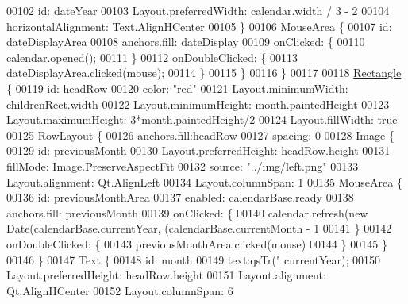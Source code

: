 \begin{DoxyCode}
{{00102                 \textcolor{keywordtype}{id}: dateYear
00103                 Layout.preferredWidth: calendar.width / 3 - 2
00104                 horizontalAlignment: Text.AlignHCenter
00105             \}
00106             MouseArea \{
00107                 \textcolor{keywordtype}{id}: dateDisplayArea
00108                 anchors.fill: dateDisplay
00109                 onClicked: \{
00110                     calendar.opened();
00111                 \}
00112                 onDoubleClicked: \{
00113                     dateDisplayArea.clicked(mouse);
00114                 \}
00115             \}
00116         \}
00117 
00118         \hyperlink{classRectangle}{Rectangle} \{
00119             \textcolor{keywordtype}{id}: headRow
00120             color: \textcolor{stringliteral}{"red"}
00121             Layout.minimumWidth: childrenRect.width
00122             Layout.minimumHeight: month.paintedHeight
00123             Layout.maximumHeight: 3*month.paintedHeight/2
00124             Layout.fillWidth: \textcolor{keyword}{true}
00125             RowLayout \{
00126                 anchors.fill:headRow
00127                 spacing: 0
00128                 Image \{
00129                     \textcolor{keywordtype}{id}: previousMonth
00130                     Layout.preferredHeight: headRow.height
00131                     fillMode: Image.PreserveAspectFit
00132                     source: \textcolor{stringliteral}{"../img/left.png"}
00133                     Layout.alignment: Qt.AlignLeft
00134                     Layout.columnSpan: 1
00135                     MouseArea \{
00136                         \textcolor{keywordtype}{id}: previousMonthArea
00137                         enabled: calendarBase.ready
00138                         anchors.fill: previousMonth
00139                         onClicked: \{
00140                             calendar.refresh(\textcolor{keyword}{new} Date(calendarBase.currentYear, (calendarBase.currentMonth 
      - 1 %
00141                         \}
00142                         onDoubleClicked: \{
00143                             previousMonthArea.clicked(mouse)
00144                         \}
00145                     \}
00146                 \}
00147                 Text \{
00148                     \textcolor{keywordtype}{id}: month
00149                     text:qsTr(\textcolor{stringliteral}{"%
      currentYear);
00150                     Layout.preferredHeight: headRow.height
00151                     Layout.alignment: Qt.AlignHCenter
00152                     Layout.columnSpan: 6
}}}
\end{DoxyCode}
